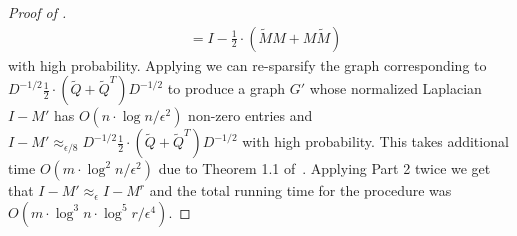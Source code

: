 \documentclass{toc}
\newcommand{\wt}{\widetilde}   %
\numberwithin{myalgctr}{section}
\theoremstyle{named}
\begin{document}
\begin{proof}[Proof of ]
\begin{align*}
&=I-\frac{1}{2}\cdot(\wt{M}M+M\wt{M})
\end{align*}
with high probability. Applying  we can re-sparsify the graph corresponding to $D^{-1/2}\frac{1}{2}\cdot(\wt{Q}+\wt{Q}^T)D^{-1/2}$ to produce a graph $G'$ whose normalized Laplacian $I-M'$ has $O(n\cdot \log n/\epsilon^2)$ non-zero entries and $I-M'\approx_{\epsilon/8}D^{-1/2}\frac{1}{2}\cdot(\wt{Q}+\wt{Q}^T)D^{-1/2}$ with high probability. This takes additional time $O(m\cdot \log^2 n/\epsilon^2)$ due to Theorem 1.1 of~\cite{KPPS16}. Applying  Part 2 twice we get that $I-M'\approx_{\epsilon}I-M^r$ and the total running time for the procedure was $O(m\cdot \log^3 n\cdot \log^5 r/\epsilon^4)$.
\end{proof}






%
%
%
%

\end{document}
